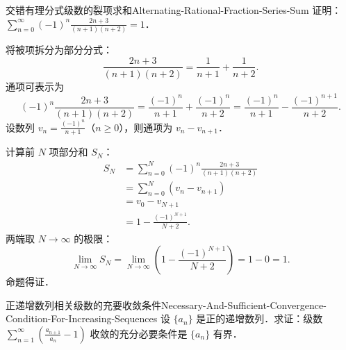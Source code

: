 \begin{problem}{交错有理分式级数的裂项求和}{Alternating-Rational-Fraction-Series-Sum}
    证明：$\sum_{n=0}^\infty (-1)^n \frac{2n+3}{(n+1)(n+2)} = 1$．
\end{problem}

\begin{myproof}
    将被项拆分为部分分式：
    \begin{equation}
        \frac{2n+3}{(n+1)(n+2)} = \frac{1}{n+1} + \frac{1}{n+2}.
    \end{equation}
    通项可表示为
    \begin{equation}
        (-1)^n \frac{2n+3}{(n+1)(n+2)} = \frac{(-1)^n}{n+1} + \frac{(-1)^n}{n+2} = \frac{(-1)^n}{n+1} - \frac{(-1)^{n+1}}{n+2}.
    \end{equation}
    设数列 $v_n = \frac{(-1)^n}{n+1}$（$n \geqslant 0$），则通项为 $v_n - v_{n+1}$．

    计算前 $N$ 项部分和 $S_N$：
    \begin{equation}
        \begin{aligned}
            S_N & = \sum_{n=0}^N (-1)^n \frac{2n+3}{(n+1)(n+2)} \\
                & = \sum_{n=0}^N (v_n - v_{n+1})                \\
                & = v_0 - v_{N+1}                               \\
                & = 1 - \frac{(-1)^{N+1}}{N+2}.
        \end{aligned}
    \end{equation}
    两端取 $N \to \infty$ 的极限：
    \begin{equation}
        \lim_{N\to\infty} S_N = \lim_{N\to\infty} \left( 1 - \frac{(-1)^{N+1}}{N+2} \right) = 1 - 0 = 1.
    \end{equation}
    命题得证．
\end{myproof}

\begin{problem}{正递增数列相关级数的充要收敛条件}{Necessary-And-Sufficient-Convergence-Condition-For-Increasing-Sequences}
    设 $\{a_n\}$ 是正的递增数列．求证：级数 $\sum_{n=1}^\infty \left(\frac{a_{n+1}}{a_n} - 1\right)$ 收敛的充分必要条件是 $\{a_n\}$ 有界．
\end{problem}

